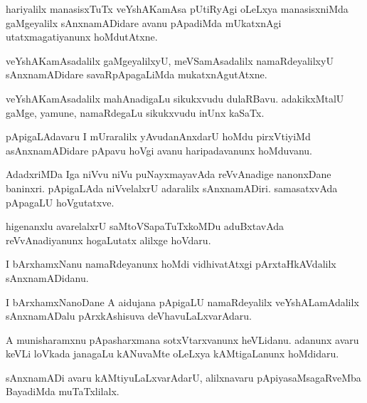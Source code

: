 \documentclass{article}
\begin{document}
\begin{mn}%
hariyalilx manasisxTuTx veYshAKamAsa pUtiRyAgi oLeLxya manasisxniMda gaMgeyalilx 
sAnxnamADidare avanu pApadiMda mUkatxnAgi utatxmagatiyanunx hoMdutAtxne.
\end{mn}

\begin{mn}%
veYshAKamAsadalilx gaMgeyalilxyU, meVSamAsadalilx namaRdeyalilxyU sAnxnamADidare 
savaRpApagaLiMda mukatxnAgutAtxne.
\end{mn}

\begin{mn}%
veYshAKamAsadalilx mahAnadigaLu sikukxvudu dulaRBavu. adakikxMtalU gaMge, yamune, 
namaRdegaLu sikukxvudu inUnx kaSaTx.
\end{mn}

\begin{mn}%
pApigaLAdavaru I mUraralilx yAvudanAnxdarU hoMdu pirxVtiyiMd asAnxnamADidare pApavu hoVgi 
avanu haripadavanunx hoMduvanu.
\end{mn}

\begin{mn}%
AdadxriMDa Iga niVvu niVu puNayxmayavAda reVvAnadige nanonxDane baninxri. pApigaLAda 
niVvelalxrU adaralilx sAnxnamADiri. samasatxvAda pApagaLU hoVgutatxve.
\end{mn}

\begin{mn}%
higenanxlu avarelalxrU saMtoVSapaTuTxkoMDu aduBxtavAda reVvAnadiyanunx hogaLutatx alilxge 
hoVdaru.
\end{mn}

\begin{mn}%
I bArxhamxNanu namaRdeyanunx hoMdi vidhivatAtxgi pArxtaHkAVdalilx sAnxnamADidanu.
\end{mn}

\begin{mn}%
I bArxhamxNanoDane A aidujana pApigaLU namaRdeyalilx veYshALamAdalilx sAnxnamADalu 
pArxkAshisuva deVhavuLaLxvarAdaru.
\end{mn}

\begin{mn}%
A munisharamxnu pApasharxmana sotxVtarxvanunx heVLidanu. adanunx avaru keVLi loVkada 
janagaLu kANuvaMte oLeLxya kAMtigaLanunx hoMdidaru.
\end{mn}

\begin{mn}%
sAnxnamADi avaru kAMtiyuLaLxvarAdarU, alilxnavaru pApiyasaMsagaRveMba BayadiMda muTaTxlilalx.
\end{mn}
\end{document}
